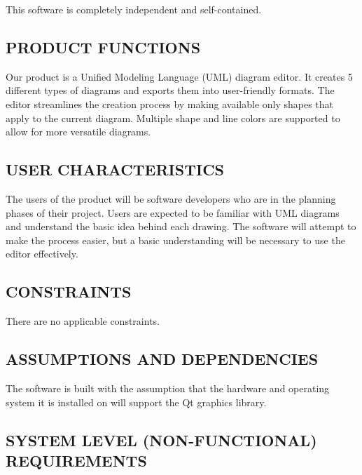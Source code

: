\documentclass[twoside,letterpaper]{article}
\begin{document}
{{\color{black}
This software is completely independent and self-contained.}

\subsection[PRODUCT
FUNCTIONS]{\rmfamily\bfseries\color{black}
PRODUCT FUNCTIONS}

{\color{black}
Our product is a Unified Modeling Language (UML) diagram editor.
It creates 5 different types of diagrams and exports them into user-friendly formats. The editor streamlines the creation process by making available only shapes that apply to the current diagram. Multiple shape and line colors are supported to allow for more versatile diagrams.}

\subsection[USER
CHARACTERISTICS]{\rmfamily\bfseries\color{black}
USER CHARACTERISTICS}

{\color{black}
The users of the product will be software developers who are in the planning phases of their project. Users are expected to be familiar with UML diagrams and understand the basic idea behind each drawing. The software will attempt to make the process easier, but a basic understanding will be necessary to use  the editor effectively.}

\subsection[CONSTRAINTS]
{\rmfamily\bfseries\color{black}
CONSTRAINTS}

{\color{black}
There are no applicable constraints.}

\subsection[ASSUMPTIONS AND
DEPENDENCIES]{\rmfamily\bfseries\color{black}
ASSUMPTIONS AND DEPENDENCIES}


{\color{black}
The software is built with the assumption that the hardware and operating system it is installed on will support the Qt graphics library.}

\subsection[SYSTEM LEVEL (NON-FUNCTIONAL)
REQUIREMENTS]
{\rmfamily\bfseries\color{black}
SYSTEM LEVEL (NON-FUNCTIONAL) REQUIREMENTS}


}
\end{document}
